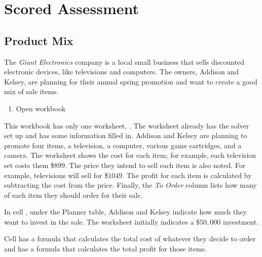 \section{Scored Assessment}

\subsection{Product Mix}

The \textit{Giant Electronics} company is a local small business that sells discounted electronic devices, like televisions and computers. The owners, Addison and Kelsey, are planning for their annual spring promotion and want to create a good mix of sale items.

\begin{enumerate}
	\item Open workbook 
\end{enumerate}

This workbook has only one worksheet, . The worksheet already has the solver set up and has some information filled in. Addison and Kelsey are planning to promote four items, a television, a computer, various game cartridges, and a camera. The worksheet shows the cost for each item; for example, each television set costs them \$$ 899 $. The price they intend to sell each item is also noted. For example, televisions will sell for \$$ 1049 $. The profit for each item is calculated by subtracting the cost from the price. Finally, the \textit{To Order} column lists how many of each item they should order for their sale.

In cell , under the Planner table, Addison and Kelsey indicate how much they want to invest in the sale. The worksheet initially indicates a \$$ 50,000 $ investment.

Cell  has a formula that calculates the total cost of whatever they decide to order and  has a formula that calculates the total profit for those items.

